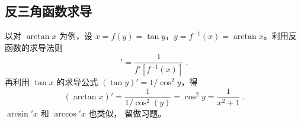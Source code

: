 \subsection{反三角函数求导}
以对 $\arctan x$ 为例，设 $x=f(y)=\tan y$，$y=f^{-1}(x)=\arctan x$。利用反函数的求导法则
\begin{equation}
[f^{-1} (x)]' = \frac{1}{f'[f^{ - 1}(x)]}~.
\end{equation} 
再利用 $\tan x$ 的求导公式 $(\tan y)'=1/\cos^2 y$，得
\begin{equation}
(\arctan x)'=\frac{1}{1/\cos^2 (y)}=\cos^2 y=\frac{1}{x^2+1}~.
\end{equation}
$\arcsin' x$ 和 $\arccos' x$ 也类似， 留做习题。
